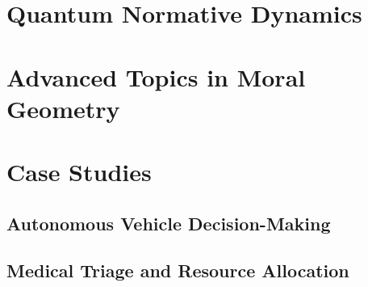 \documentclass[12pt,letterpaper,twoside,openright]{book}
\theoremstyle{plain}
\theoremstyle{definition}
\theoremstyle{remark}
\begin{document}


\chapter{Quantum Normative Dynamics}
\label{ch:qnd}



\chapter{Advanced Topics in Moral Geometry}
\label{ch:advanced}



\chapter{Case Studies}
\label{ch:case-studies}

\section{Autonomous Vehicle Decision-Making}

\section{Medical Triage and Resource Allocation}
\end{document}
